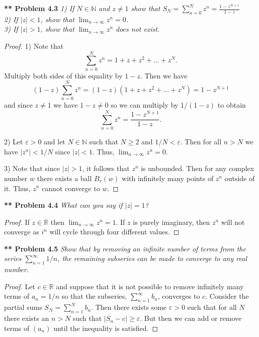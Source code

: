 \documentclass{article}
\begin{document}
\begin{flushleft}
\textbf{** Problem 4.3}
\textit{1) If $N \in \mathbb{N}$ and $z \neq 1$ show that $S_N = \sum_{n=0}^{N} z^n = \frac{1 - z^{N+1}}{1-z}$\\
2) If $|z| < 1$, show that $\lim_{n \rightarrow \infty} z^n = 0$.\\
3) If $|z| > 1$, show that $\lim_{n \rightarrow \infty} z^n$ does not exist.}
\begin{proof}
1) Note that
\[
\sum_{n=0}^{N} z^n = 1 + z + z^2 + \dots + z^N.
\]
Multiply both sides of this equality by $1-z$. Then we have
\[
(1-z)\sum_{n=0}^{N} z^n = (1-z) (1 + z + z^2 + \dots + z^N) = 1 - z^{N+1}
\]
and since $z \neq 1$ we have $1 - z \neq 0$ so we can multiply by $1/(1-z)$ to obtain
\[
\sum_{n=0}^{N} z^n = \frac{1 - z^{N+1}}{1-z}.
\]\newline

2) Let $\varepsilon > 0$ and let $N \in \mathbb{N}$ such that $N \geq 2$ and $1/N < \varepsilon$. Then for all $n > N$ we have $|z^n| < 1/N$ since $|z| < 1$. Thus, $\lim_{n \rightarrow \infty} z^n = 0$.\newline

3) Note that since $|z| > 1$, it follows that $z^n$ is unbounded. Then for any complex number $w$ there exists a ball $B_r(w)$ with infinitely many points of $z^n$ outside of it. Thus, $z^n$ cannot converge to $w$.
\end{proof}

\textbf{** Problem 4.4}
\textit{What can you say if $|z| = 1$?}
\begin{proof}
If $z \in \mathbb{R}$ then $\lim_{n \rightarrow \infty} z^n = 1$. If $z$ is purely imaginary, then $z^n$ will not converge as $i^n$ will cycle through four different values.
\end{proof}

\textbf{** Problem 4.5}
\textit{Show that by removing an infinite number of terms from the series $\sum_{n=1}^{\infty} 1/n$, the remaining subseries can be made to converge to any real number.}
\begin{proof}
Let $c \in \mathbb{R}$ and suppose that it is not possible to remove infinitely many terms of $a_n = 1/n$ so that the subseries, $\sum_{n=1}^{\infty} b_n$, converges to $c$. Consider the partial sums $S_N = \sum_{n=1}^{N} b_n$. Then there exists some $\varepsilon > 0$ such that for all $N$ there exists an $n > N$ such that $|S_n - c| \geq \varepsilon$. But then we can add or remove terms of $(a_n)$ until the inequality is satisfied.
\end{proof}


\end{flushleft}
\end{document}

